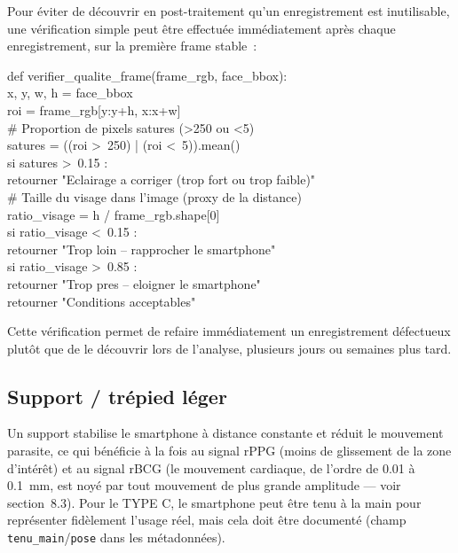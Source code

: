 \documentclass[11pt,a4paper]{article}
\begin{document}
Pour \'eviter de d\'ecouvrir en post-traitement qu'un enregistrement est
inutilisable, une v\'erification simple peut \^etre effectu\'ee
imm\'ediatement apr\`es chaque enregistrement, sur la premi\`ere frame
stable~:

\begin{codebox}
def verifier\_qualite\_frame(frame\_rgb, face\_bbox):\\
\quad x, y, w, h = face\_bbox\\
\quad roi = frame\_rgb[y:y+h, x:x+w]\\[4pt]
\quad \# Proportion de pixels satures (\textgreater250 ou \textless5)\\
\quad satures = ((roi \textgreater\ 250) | (roi \textless\ 5)).mean()\\
\quad si satures \textgreater\ 0.15 :\\
\quad\quad retourner "Eclairage a corriger (trop fort ou trop faible)"\\[4pt]
\quad \# Taille du visage dans l'image (proxy de la distance)\\
\quad ratio\_visage = h / frame\_rgb.shape[0]\\
\quad si ratio\_visage \textless\ 0.15 :\\
\quad\quad retourner "Trop loin -- rapprocher le smartphone"\\
\quad si ratio\_visage \textgreater\ 0.85 :\\
\quad\quad retourner "Trop pres -- eloigner le smartphone"\\[4pt]
\quad retourner "Conditions acceptables"
\end{codebox}

Cette v\'erification permet de refaire imm\'ediatement un enregistrement
d\'efectueux plut\^ot que de le d\'ecouvrir lors de l'analyse, plusieurs
jours ou semaines plus tard.

\subsection{Support / tr\'epied l\'eger}

Un support stabilise le smartphone \`a distance constante et r\'eduit le
mouvement parasite, ce qui b\'en\'eficie \`a la fois au signal rPPG (moins
de glissement de la zone d'int\'er\^et) et au signal rBCG (le mouvement
cardiaque, de l'ordre de 0.01 \`a 0.1~mm, est noy\'e par tout mouvement de
plus grande amplitude --- voir section~8.3). Pour le TYPE C, le smartphone
peut \^etre tenu \`a la main pour repr\'esenter fid\`element l'usage r\'eel,
mais cela doit \^etre document\'e (champ \texttt{tenu\_main}/\texttt{pose}
dans les m\'etadonn\'ees).
\end{document}
